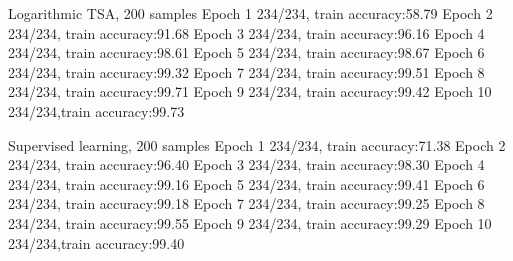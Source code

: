 \documentclass[a4paper]{article}
\begin{document}
Logarithmic TSA, 200 samples
Epoch 1 234/234, train accuracy:58.79%
Epoch 2 234/234, train accuracy:91.68%
Epoch 3 234/234, train accuracy:96.16%
Epoch 4 234/234, train accuracy:98.61%
Epoch 5 234/234, train accuracy:98.67%
Epoch 6 234/234, train accuracy:99.32%
Epoch 7 234/234, train accuracy:99.51%
Epoch 8 234/234, train accuracy:99.71%
Epoch 9 234/234, train accuracy:99.42%
Epoch 10 234/234,train accuracy:99.73%
 
Supervised learning, 200 samples
Epoch 1 234/234, train accuracy:71.38%
Epoch 2 234/234, train accuracy:96.40%
Epoch 3 234/234, train accuracy:98.30%
Epoch 4 234/234, train accuracy:99.16%
Epoch 5 234/234, train accuracy:99.41%
Epoch 6 234/234, train accuracy:99.18%
Epoch 7 234/234, train accuracy:99.25%
Epoch 8 234/234, train accuracy:99.55%
Epoch 9 234/234, train accuracy:99.29%
Epoch 10 234/234,train accuracy:99.40%
 
\end{document}
